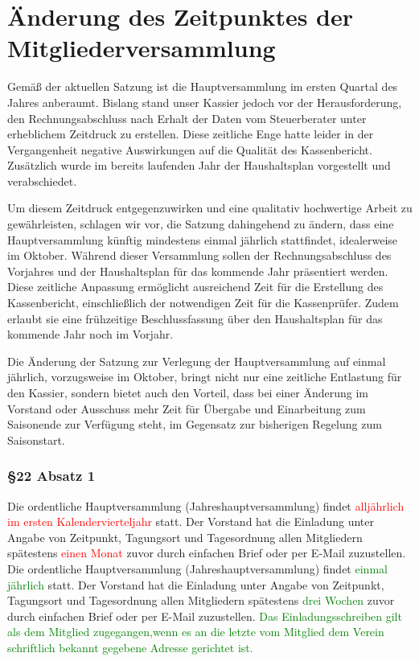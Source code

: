 \documentclass[10pt,a4paper,parskip=half]{scrartcl}
\newcommand{\new}[1]{\textcolor{Green}{#1}}
\newcommand{\old}[1]{\textcolor{Red}{#1}}
\newcommand{\change}[1]{
  \begin{adjustwidth}{20pt}{20pt}
    #1
  \end{adjustwidth}
}
\newcommand{\compare}[3]{\change{\subsubsection*{#1}\begin{multicols}{2}#2\columnbreak\\#3\end{multicols}}}
\begin{document}
\section{Änderung des Zeitpunktes der Mitgliederversammlung}
Gemäß der aktuellen Satzung ist die Hauptversammlung im ersten Quartal des Jahres anberaumt. Bislang stand unser Kassier jedoch vor der Herausforderung, den Rechnungsabschluss nach Erhalt der Daten vom Steuerberater unter erheblichem Zeitdruck zu erstellen. Diese zeitliche Enge hatte leider in der Vergangenheit negative Auswirkungen auf die Qualität des Kassenbericht. Zusätzlich wurde im bereits laufenden Jahr der Haushaltsplan vorgestellt und verabschiedet.

Um diesem Zeitdruck entgegenzuwirken und eine qualitativ hochwertige Arbeit zu gewährleisten, schlagen wir vor, die Satzung dahingehend zu ändern, dass eine Hauptversammlung künftig mindestens einmal jährlich stattfindet, idealerweise im Oktober. Während dieser Versammlung sollen der Rechnungsabschluss des Vorjahres und der Haushaltsplan für das kommende Jahr präsentiert werden. Diese zeitliche Anpassung ermöglicht ausreichend Zeit für die Erstellung des Kassenbericht, einschließlich der notwendigen Zeit für die Kassenprüfer. Zudem erlaubt sie eine frühzeitige Beschlussfassung über den Haushaltsplan für das kommende Jahr noch im Vorjahr.

Die Änderung der Satzung zur Verlegung der Hauptversammlung auf einmal jährlich, vorzugsweise im Oktober, bringt nicht nur eine zeitliche Entlastung für den Kassier, sondern bietet auch den Vorteil, dass bei einer Änderung im Vorstand oder Ausschuss mehr Zeit für Übergabe und Einarbeitung zum Saisonende zur Verfügung steht, im Gegensatz zur bisherigen Regelung zum Saisonstart.

\compare{§22 Absatz 1}{
  Die ordentliche Hauptversammlung (Jahreshauptversammlung) findet \old{alljährlich im ersten Kalendervierteljahr} statt.
  Der Vorstand hat die Einladung unter Angabe von Zeitpunkt,
  Tagungsort und Tagesordnung allen Mitgliedern spätestens \old{einen Monat} zuvor durch einfachen Brief oder per E-Mail zuzustellen.
}{
  Die ordentliche Hauptversammlung (Jahreshauptversammlung) findet \new{einmal jährlich} statt.
  Der Vorstand hat die Einladung unter Angabe von Zeitpunkt,
  Tagungsort und Tagesordnung allen Mitgliedern spätestens \new{drei Wochen} zuvor durch einfachen Brief oder per E-Mail zuzustellen.
  \new{Das Einladungsschreiben gilt als dem Mitglied zugegangen,wenn es an die letzte vom Mitglied dem Verein schriftlich bekannt gegebene Adresse gerichtet ist.}
}
\end{document}
